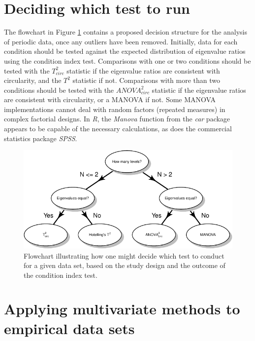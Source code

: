 \documentclass[]{article}
\begin{document}
\hypertarget{deciding-which-test-to-run}{%
\section{Deciding which test to run}\label{deciding-which-test-to-run}}

The flowchart in Figure \ref{fig:flowchart} contains a proposed decision structure for the analysis of periodic data, once any outliers have been removed. Initially, data for each condition should be tested against the expected distribution of eigenvalue ratios using the condition index test. Comparisons with one or two conditions should be tested with the \(T^2_{circ}\) statistic if the eigenvalue ratios are consistent with circularity, and the \(T^2\) statistic if not. Comparisons with more than two conditions should be tested with the \(ANOVA^2_{circ}\) statistic if the eigenvalue ratios are consistent with circularity, or a MANOVA if not. Some MANOVA implementations cannot deal with random factors (repeated measures) in complex factorial designs. In \emph{R}, the \emph{Manova} function from the \emph{car} package appears to be capable of the necessary calculations, as does the commercial statistics package \emph{SPSS}.

\begin{figure}

{\centering \includegraphics{manuscript_files/figure-latex/flowchart-1} 

}

\caption{Flowchart illustrating how one might decide which test to conduct for a given data set, based on the study design and the outcome of the condition index test.}\label{fig:flowchart}
\end{figure}

\hypertarget{applying-multivariate-methods-to-empirical-data-sets}{%
\section{Applying multivariate methods to empirical data sets}\label{applying-multivariate-methods-to-empirical-data-sets}}
\end{document}
